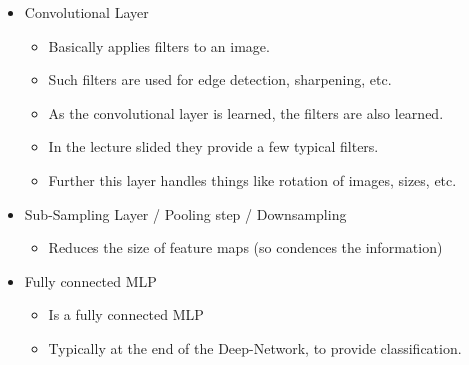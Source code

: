 \documentclass[12pt,a4paper]{article}
\begin{document}
\begin{itemize}
    \item Convolutional Layer
        \begin{itemize}
            \item Basically applies filters to an image.
            \item Such filters are used for edge detection, sharpening, etc.
            \item As the convolutional layer is learned, the filters are also learned.
            \item In the lecture slided they provide a few typical filters.
            \item Further this layer handles things like rotation of images, sizes, etc.
        \end{itemize}
    \item Sub-Sampling Layer / Pooling step / Downsampling
        \begin{itemize}
            \item Reduces the size of feature maps (so condences the information)
        \end{itemize}
    \item Fully connected MLP
        \begin{itemize}
            \item Is a fully connected MLP
            \item Typically at the end of the Deep-Network, to provide classification.
        \end{itemize}
\end{itemize}
\end{document}
